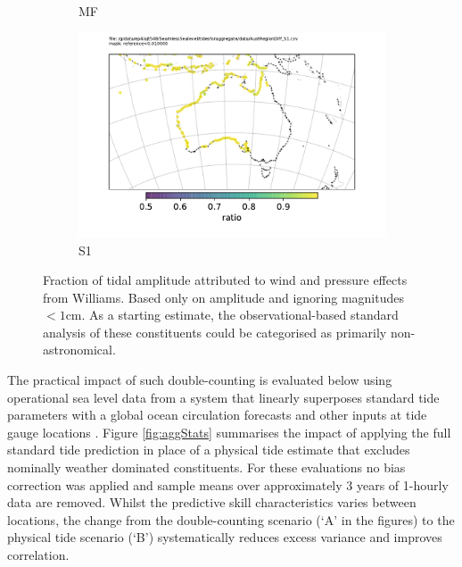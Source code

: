 \begin{figure}[H]
\begin{subfigure}[b]{\figwidthHalf}
        \caption{MF}
    \end{subfigure}
    \begin{subfigure}[b]{\figwidthHalf}
        \includegraphics[width=\textwidth]{figures/maps/AustRegionDiff_S1.pdf}
        \caption{S1}
    \end{subfigure}
    \caption{Fraction of tidal amplitude attributed to wind and pressure effects from Williams\cite{10.5194/os-2020-107}.  Based only on amplitude and ignoring magnitudes $<1$cm.  As a starting estimate, the observational-based standard analysis of these constituents could be categorised as primarily non-astronomical.}
    \label{fig:williamsFraction}
\end{figure}

The practical impact of such double-counting is evaluated below using operational sea level data from a system that linearly superposes standard tide parameters with a global ocean circulation forecasts and other inputs at tide gauge locations \cite{Taylor:2017coa}\cite{10.1080/1755876x.2019.1685834}.
Figure \ref{fig:aggStats} summarises the impact of applying the full standard tide prediction 
in place of a physical tide estimate that excludes nominally weather dominated constituents.
For these evaluations no bias correction was applied and sample means over approximately 3 years of 1-hourly data are removed.  Whilst the predictive skill characteristics varies between locations, the change from the double-counting scenario (`A' in the figures) to the physical tide scenario (`B') systematically reduces excess variance and improves correlation.


